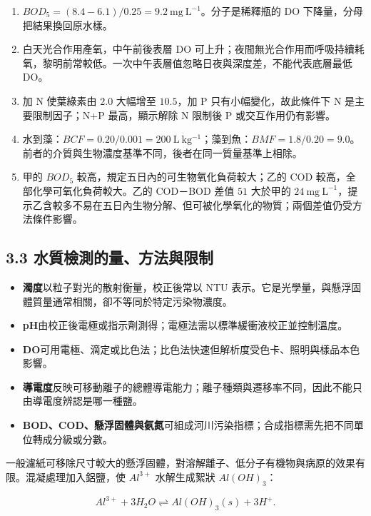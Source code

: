\documentclass[11pt,a4paper]{article}
\providecommand{\tightlist}{%
  \setlength{\itemsep}{0pt}\setlength{\parskip}{0pt}}
\begin{document}
\begin{enumerate}
\def\labelenumi{\arabic{enumi}.}
\tightlist
\item
  \(BOD_5=(8.4-6.1)/0.25=9.2\ \mathrm{mg\ L^{-1}}\)。分子是稀釋瓶的 DO 下降量，分母把結果換回原水樣。
\item
  白天光合作用產氧，中午前後表層 DO 可上升；夜間無光合作用而呼吸持續耗氧，黎明前常較低。一次中午表層值忽略日夜與深度差，不能代表底層最低 DO。
\item
  加 N 使葉綠素由 \(2.0\) 大幅增至 \(10.5\)，加 P 只有小幅變化，故此條件下 N 是主要限制因子；N+P 最高，顯示解除 N 限制後 P 或交互作用仍有影響。
\item
  水到藻：\(BCF=0.20/0.001=200\ \mathrm{L\ kg^{-1}}\)；藻到魚：\(BMF=1.8/0.20=9.0\)。前者的介質與生物濃度基準不同，後者在同一質量基準上相除。
\item
  甲的 \(BOD_5\) 較高，規定五日內的可生物氧化負荷較大；乙的 COD 較高，全部化學可氧化負荷較大。乙的 COD－BOD 差值 \(51\) 大於甲的 \(24\ \mathrm{mg\ L^{-1}}\)，提示乙含較多不易在五日內生物分解、但可被化學氧化的物質；兩個差值仍受方法條件影響。
\end{enumerate}

\subsection{3.3 水質檢測的量、方法與限制}\label{ux6c34ux8ceaux6aa2ux6e2cux7684ux91cfux65b9ux6cd5ux8207ux9650ux5236}

\begin{itemize}
\tightlist
\item
  \textbf{濁度}以粒子對光的散射衡量，校正後常以 NTU 表示。它是光學量，與懸浮固體質量通常相關，卻不等同於特定污染物濃度。
\item
  \textbf{pH}由校正後電極或指示劑測得；電極法需以標準緩衝液校正並控制溫度。
\item
  \textbf{DO}可用電極、滴定或比色法；比色法快速但解析度受色卡、照明與樣品本色影響。
\item
  \textbf{導電度}反映可移動離子的總體導電能力；離子種類與遷移率不同，因此不能只由導電度辨認是哪一種鹽。
\item
  \textbf{BOD、COD、懸浮固體與氨氮}可組成河川污染指標；合成指標需先把不同單位轉成分級或分數。
\end{itemize}

一般濾紙可移除尺寸較大的懸浮固體，對溶解離子、低分子有機物與病原的效果有限。混凝處理加入鋁鹽，使 \(Al^{3+}\) 水解生成絮狀 \(Al(OH)_3\)：

\[
Al^{3+}+3H_2O\rightleftharpoons Al(OH)_3(s)+3H^+.
\]
\end{document}
